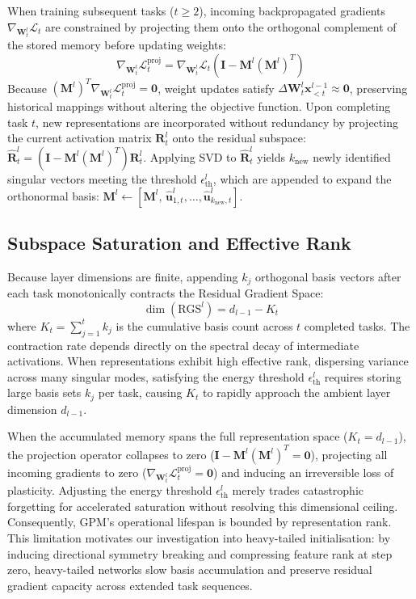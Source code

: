 \documentclass[11pt,oneside]{report}
\begin{document}
When training subsequent tasks ($t \ge 2$), incoming backpropagated gradients $\nabla_{\mathbf{W}_t^l} \mathcal{L}_t$ are constrained by projecting them onto the orthogonal complement of the stored memory before updating weights:
\begin{equation}
	\nabla_{\mathbf{W}_t^l} \mathcal{L}_t^{\text{proj}} = \nabla_{\mathbf{W}_t^l} \mathcal{L}_t \left( \mathbf{I} - \mathbf{M}^l (\mathbf{M}^l)^T \right)
\end{equation}
Because $(\mathbf{M}^l)^T \nabla_{\mathbf{W}_t^l} \mathcal{L}_t^{\text{proj}} = \mathbf{0}$, weight updates satisfy $\Delta \mathbf{W}_t^l \mathbf{x}_{<t}^{l-1} \approx \mathbf{0}$, preserving historical mappings without altering the objective function. Upon completing task $t$, new representations are incorporated without redundancy by projecting the current activation matrix $\mathbf{R}_t^l$ onto the residual subspace: $\hat{\mathbf{R}}_t^l = (\mathbf{I} - \mathbf{M}^l (\mathbf{M}^l)^T) \mathbf{R}_t^l$. Applying SVD to $\hat{\mathbf{R}}_t^l$ yields $k_{\text{new}}$ newly identified singular vectors meeting the threshold $\epsilon_{\text{th}}^l$, which are appended to expand the orthonormal basis: $\mathbf{M}^l \leftarrow [\mathbf{M}^l, \, \hat{\mathbf{u}}_{1,t}^l, \dots, \hat{\mathbf{u}}_{k_{\text{new}},t}^l]$.
\subsection{Subspace Saturation and Effective Rank}
Because layer dimensions are finite, appending $k_j$ orthogonal basis vectors after each task monotonically contracts the Residual Gradient Space:
\begin{equation}
	\dim(\text{RGS}^l) = d_{l-1} - K_t
\end{equation}
where $K_t = \sum_{j=1}^t k_j$ is the cumulative basis count across $t$ completed tasks. The contraction rate depends directly on the spectral decay of intermediate activations. When representations exhibit high effective rank, dispersing variance across many singular modes, satisfying the energy threshold $\epsilon_{\text{th}}^l$ requires storing large basis sets $k_j$ per task, causing $K_t$ to rapidly approach the ambient layer dimension $d_{l-1}$.

When the accumulated memory spans the full representation space ($K_t = d_{l-1}$), the projection operator collapses to zero ($\mathbf{I} - \mathbf{M}^l (\mathbf{M}^l)^T = \mathbf{0}$), projecting all incoming gradients to zero ($\nabla_{\mathbf{W}_t^l} \mathcal{L}_t^{\text{proj}} = \mathbf{0}$) and inducing an irreversible loss of plasticity. Adjusting the energy threshold $\epsilon_{\text{th}}^l$ merely trades catastrophic forgetting for accelerated saturation without resolving this dimensional ceiling. Consequently, GPM's operational lifespan is bounded by representation rank. This limitation motivates our investigation into heavy-tailed initialisation: by inducing directional symmetry breaking and compressing feature rank at step zero, heavy-tailed networks slow basis accumulation and preserve residual gradient capacity across extended task sequences.
\end{document}
